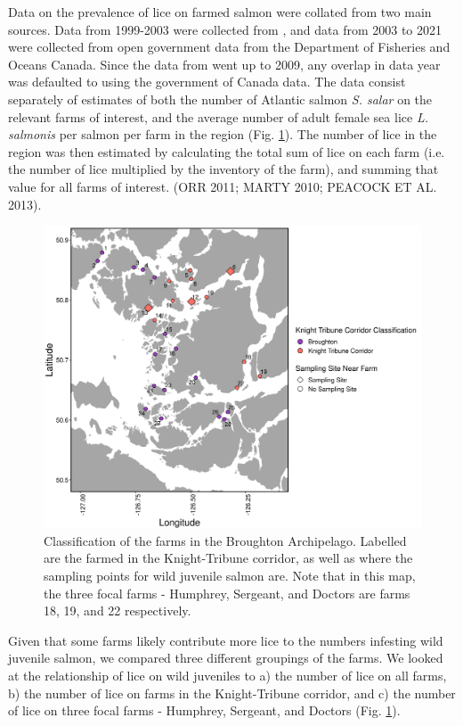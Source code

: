 \documentclass{article}
\begin{document}
Data on the prevalence of lice on farmed salmon were collated from two main sources. Data from 1999-2003 were collected from \cite{marty_relationship_2010}, and data from 2003 to 2021 were collected from open government data from the Department of Fisheries and Oceans Canada. Since the data from \cite{marty_relationship_2010} went up to 2009, any overlap in data year was defaulted to using the government of Canada data. The data consist separately of estimates of both the number of Atlantic salmon \textit{S. salar} on the relevant farms of interest, and the average number of adult female sea lice \textit{L. salmonis} per salmon per farm in the region (Fig. \ref{fig:map1}). The number of lice in the region was then estimated by calculating the total sum of lice on each farm (i.e. the number of lice multiplied by the inventory of the farm), and summing that value for all farms of interest. (ORR 2011; MARTY 2010; PEACOCK ET AL. 2013). 

\begin{figure}[h]
    \centering
    \includegraphics[width=\textwidth]{images/numbered-farm-map.png}
    \caption{Classification of the farms in the Broughton Archipelago. Labelled are the farmed in the Knight-Tribune corridor, as well as where the sampling points for wild juvenile salmon are. Note that in this map, the three focal farms - Humphrey, Sergeant, and Doctors are farms 18, 19, and 22 respectively.}
    \label{fig:map1}
\end{figure}

Given that some farms likely contribute more lice to the numbers infesting wild juvenile salmon, we compared three different groupings of the farms. We looked at the relationship of lice on wild juveniles to a) the number of lice on all farms, b) the number of lice on farms in the Knight-Tribune corridor, and c) the number of lice on three focal farms - Humphrey, Sergeant, and Doctors (Fig. \ref{fig:map1}). 
\end{document}
